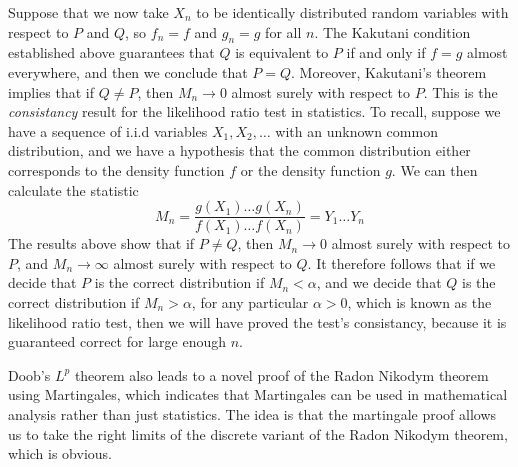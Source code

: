 \begin{example}
Suppose that we now take $X_n$ to be identically distributed random variables with respect to $P$ and $Q$, so $f_n = f$ and $g_n = g$ for all $n$. The Kakutani condition established above guarantees that $Q$ is equivalent to $P$ if and only if $f = g$ almost everywhere, and then we conclude that $P = Q$. Moreover, Kakutani's theorem implies that if $Q \neq P$, then $M_n \to 0$ almost surely with respect to $P$. This is the {\it consistancy} result for the likelihood ratio test in statistics. To recall, suppose we have a sequence of i.i.d variables $X_1, X_2, \dots$  with an unknown common distribution, and we have a hypothesis that the common distribution either corresponds to the density function $f$ or the density function $g$. We can then calculate the statistic
%
\[ M_n = \frac{g(X_1) \dots g(X_n)}{f(X_1) \dots f(X_n)} = Y_1 \dots Y_n \]
%
The results above show that if $P \neq Q$, then $M_n \to 0$ almost surely with respect to $P$, and $M_n \to \infty$ almost surely with respect to $Q$. It therefore follows that if we decide that $P$ is the correct distribution if $M_n < \alpha$, and we decide that $Q$ is the correct distribution if $M_n > \alpha$, for any particular $\alpha > 0$, which is known as the likelihood ratio test, then we will have proved the test's consistancy, because it is guaranteed correct for large enough $n$.
\end{example}

Doob's $L^p$ theorem also leads to a novel proof of the Radon Nikodym theorem using Martingales, which indicates that Martingales can be used in mathematical analysis rather than just statistics. The idea is that the martingale proof allows us to take the right limits of the discrete variant of the Radon Nikodym theorem, which is obvious.

